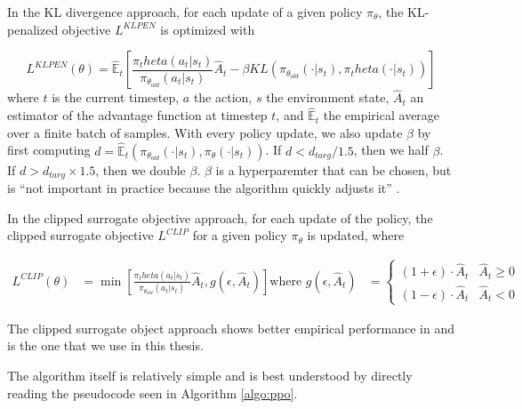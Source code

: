In the KL divergence approach, for each update of a given policy $\pi_\theta$, the KL-penalized objective $L^{KLPEN}$ is optimized with

\begin{equation}
	L^{KLPEN}(\theta) = \hat{\mathbb{E}}_t \left[\frac{\pi_theta(a_t | s_t)}{\pi_{\theta_{old}} (a_t | s_t)} \hat{A}_t - \beta KL \left( \pi_{\theta_{old}} (\cdot | s_t), \pi_theta(\cdot | s_t)\right) \right]
\end{equation}
where $t$ is the current timestep, $a$ the action, $s$ the environment state, $\hat{A}_t$ an estimator of the advantage function at timestep $t$, and $\hat{\mathbb{E}}_t$ the empirical average over a finite batch of samples.
With every policy update, we also update $\beta$ by first computing $d = \hat{\mathbb{E}}_t\left(\pi_{\theta_{old}} (\cdot | s_t), \pi_{\theta}(\cdot | s_t)\right)$.
If $d < d_{targ} / 1.5$, then we half $\beta$.
If $d > d_{targ} \times 1.5$, then we double $\beta$. $\beta$ is a hyperparemter that can be chosen, but is ``not important in practice because the algorithm quickly adjusts it'' \cite{schulman2017proximal}.

In the clipped surrogate objective approach, for each update of the policy, the clipped surrogate objective $L^{CLIP}$ for a given policy $\pi_\theta$ is updated, where

\begin{align}
	L^{CLIP}(\theta) &= \min \left[ 
		\frac{\pi_theta(a_t | s_t)}{\pi_{\theta_{old}} (a_t | s_t)} \hat{A}_t, g(\epsilon, \hat{A}_t)
	\right]
	\text{where } g(\epsilon, \hat{A}_t) &= \begin{cases}
		(1 + \epsilon) \cdot \hat{A}_t & \hat{A}_t \geq 0 \\
		(1 - \epsilon) \cdot \hat{A}_t & \hat{A}_t < 0
	\end{cases}
\end{align}

The clipped surrogate object approach shows better empirical performance in \cite{schulman2017proximal} and is the one that we use in this thesis.

The algorithm itself is relatively simple and is best understood by directly reading the pseudocode seen in Algorithm \ref{algo:ppo}.

